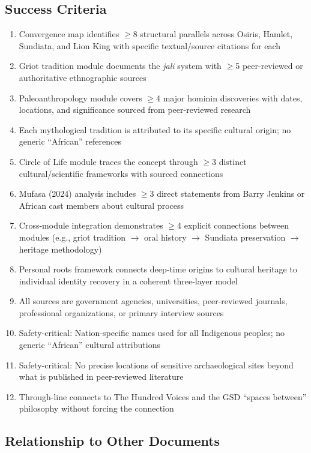 \documentclass[11pt,letterpaper]{article}
\begin{document}
\subsection{Success Criteria}

\begin{enumerate}[leftmargin=2em]
  \item Convergence map identifies $\geq$8 structural parallels across Osiris, Hamlet, Sundiata, and Lion King with specific textual/source citations for each
  \item Griot tradition module documents the \textit{jali} system with $\geq$5 peer-reviewed or authoritative ethnographic sources
  \item Paleoanthropology module covers $\geq$4 major hominin discoveries with dates, locations, and significance sourced from peer-reviewed research
  \item Each mythological tradition is attributed to its specific cultural origin; no generic ``African'' references
  \item Circle of Life module traces the concept through $\geq$3 distinct cultural/scientific frameworks with sourced connections
  \item Mufasa (2024) analysis includes $\geq$3 direct statements from Barry Jenkins or African cast members about cultural process
  \item Cross-module integration demonstrates $\geq$4 explicit connections between modules (e.g., griot tradition $\rightarrow$ oral history $\rightarrow$ Sundiata preservation $\rightarrow$ heritage methodology)
  \item Personal roots framework connects deep-time origins to cultural heritage to individual identity recovery in a coherent three-layer model
  \item All sources are government agencies, universities, peer-reviewed journals, professional organizations, or primary interview sources
  \item Safety-critical: Nation-specific names used for all Indigenous peoples; no generic ``African'' cultural attributions
  \item Safety-critical: No precise locations of sensitive archaeological sites beyond what is published in peer-reviewed literature
  \item Through-line connects to The Hundred Voices and the GSD ``spaces between'' philosophy without forcing the connection
\end{enumerate}

\subsection{Relationship to Other Documents}
\end{document}
